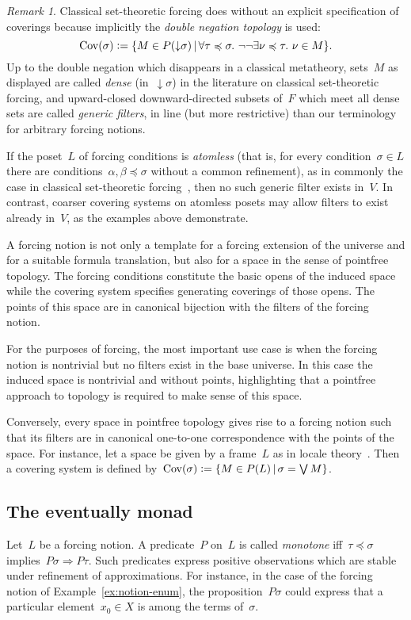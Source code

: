 \documentclass[com,11pt,crcready]{iosart2x}
\theoremstyle{definition}
\theoremstyle{plain}
\theoremstyle{remark}
\newtheorem{remark}[definition]{Remark}
\newcommand{\?}{\,{:}\,}
\newcommand{\defeq}{\vcentcolon=}
\newcommand{\Cov}{\mathrm{Cov}}
\renewcommand{\_}{\mathpunct{.}\,}
\begin{document}
\begin{remark}Classical set-theoretic forcing
does without an explicit specification of coverings because implicitly the
\emph{double negation topology} is used:
\[ \Cov(\sigma) \defeq \{ M \in P({\downarrow}\sigma) \,|\,
  \forall \tau \preccurlyeq \sigma\_ \neg\neg \exists \nu \preccurlyeq \tau\_ \nu \in M
  \}. \]
Up to the double negation which disappears in a classical metatheory, sets~$M$ as displayed are called
\emph{dense} (in~${\downarrow}\sigma$) in the literature on classical set-theoretic forcing, and
upward-closed downward-directed subsets of~$F$ which meet all dense sets are
called \emph{generic filters}, in line (but more restrictive) than our
terminology for arbitrary forcing notions.

If the poset~$L$ of forcing conditions is \emph{atomless} (that is, for every
condition~$\sigma \in L$ there are conditions~$\alpha,\beta \preccurlyeq \sigma$
without a common refinement), as in commonly the case in classical
set-theoretic forcing~\cite[Lemma~1.33]{schilhan:bsc}, then no such generic filter exists in~$V$.
In contrast, coarser covering systems on atomless posets may allow
filters to exist already in~$V$, as the examples above demonstrate.
\end{remark}

A forcing notion is not only a template for a forcing extension of the universe and
for a suitable formula translation, but also for a space in the sense of
pointfree topology. The forcing conditions constitute the basic opens of the
induced space while the covering system specifies generating coverings of
those opens. The points of this space are in canonical bijection with the
filters of the forcing notion.

For the purposes of forcing, the most important use case is when the forcing
notion is nontrivial but no filters exist in the base universe. In this case
the induced space is nontrivial and without points, highlighting that a
pointfree approach to topology is required to make sense of this space.

Conversely, every space in pointfree topology gives rise to a forcing notion such that its
filters are in canonical one-to-one correspondence with the points of the space.
For instance, let a space be given by a frame~$L$ as in locale
theory~\cite{picado-pultr:frames-and-locales}. Then a covering system is
defined by~$\Cov(\sigma) \defeq \{ M \in P(L) \,|\, \sigma = \bigvee M \}$.


\subsection{The eventually monad} Let~$L$ be a forcing notion. A
predicate~$P$ on~$L$ is called \emph{monotone} iff~$\tau \preccurlyeq \sigma$
implies~$P\sigma \Rightarrow P\tau$. Such predicates express positive
observations which are stable under refinement of approximations. For
instance, in the case of the forcing notion of Example~\ref{ex:notion-enum},
the proposition~$P\sigma$ could express that a particular element~$x_0 \in X$
is among the terms of~$\sigma$.
\end{document}
